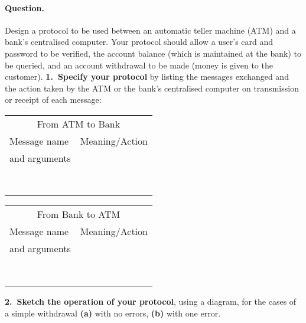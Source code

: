 \paragraph{Question.} Design a protocol to be used between an automatic teller
machine (ATM) and a bank's centralised computer. Your protocol should
allow a user's card and password to be verified, the account balance
(which is maintained at the bank) to be queried, and an account
withdrawal to be made (money is given to the
customer). \textbf{1.~Specify your protocol} by listing the messages
exchanged and the action taken by the ATM or the bank's centralised
computer on transmission or receipt of each message:
\begin{center}
\begin{tabular}{@{}p{170pt}p{170pt}@{}}
\toprule
\multicolumn{2}{c}{From ATM to Bank}\\
\cmidrule(r{0pt}){1-2}
Message name & Meaning/Action\\
and arguments &\\
\midrule
 & \\
 & \\
 & \\
 & \\
 & \\
 & \\
 & \\
 & \\
\bottomrule
\end{tabular}

\begin{tabular}{@{}p{170pt}p{170pt}@{}}
\toprule
\multicolumn{2}{c}{From Bank to ATM}\\
\cmidrule(r{0pt}){1-2}
Message name & Meaning/Action\\
and arguments &\\
\midrule
 & \\
 & \\
 & \\
 & \\
 & \\
 & \\
 & \\
 & \\
\bottomrule
\end{tabular}
\end{center}
\noindent\textbf{2.~Sketch the operation of your protocol}, using a
diagram, for the cases of a simple withdrawal \textbf{(a)} with no
errors, \textbf{(b)} with one error.
